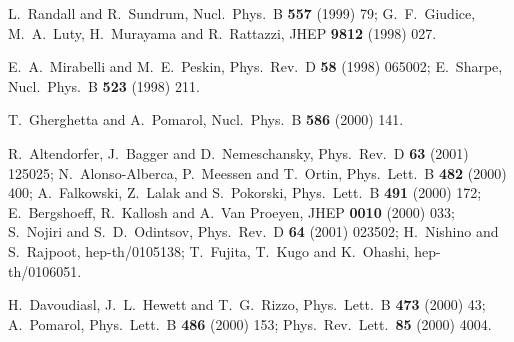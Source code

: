 \documentclass[a4paper,12pt]{article}
\begin{document}
\begin{thebibliography}{99}
L.~Randall and R.~Sundrum,
Nucl.\ Phys.\ B {\bf 557} (1999) 79;
G.~F.~Giudice, M.~A.~Luty, H.~Murayama and R.~Rattazzi,
JHEP {\bf 9812} (1998) 027.



E.~A.~Mirabelli and M.~E.~Peskin,
Phys.\ Rev.\ D {\bf 58} (1998) 065002;
E.~Sharpe,
Nucl.\ Phys.\ B {\bf 523} (1998) 211.






T.~Gherghetta and A.~Pomarol,
Nucl.\ Phys.\ B {\bf 586} (2000) 141.


R.~Altendorfer, J.~Bagger and D.~Nemeschansky,
Phys.\ Rev.\ D {\bf 63} (2001) 125025;
N.~Alonso-Alberca, P.~Meessen and T.~Ortin,
Phys.\ Lett.\ B {\bf 482} (2000) 400;
A.~Falkowski, Z.~Lalak and S.~Pokorski,
Phys.\ Lett.\ B {\bf 491} (2000) 172;
E.~Bergshoeff, R.~Kallosh and A.~Van Proeyen,
JHEP {\bf 0010} (2000) 033;
S.~Nojiri and S.~D.~Odintsov,
Phys.\ Rev.\ D {\bf 64} (2001) 023502;
H.~Nishino and S.~Rajpoot,
hep-th/0105138;
T.~Fujita, T.~Kugo and K.~Ohashi,
hep-th/0106051.



H.~Davoudiasl, J.~L.~Hewett and T.~G.~Rizzo,
Phys.\ Lett.\ B {\bf 473} (2000) 43;
A.~Pomarol,
Phys.\ Lett.\ B {\bf 486} (2000) 153;
Phys.\ Rev.\ Lett.\  {\bf 85} (2000) 4004.




\end{thebibliography}
\end{document}
